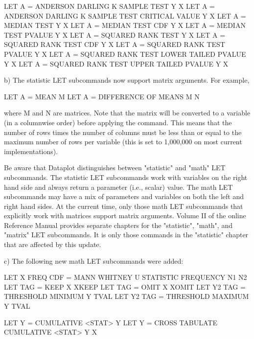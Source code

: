 {          LET A = ANDERSON DARLING K SAMPLE TEST                     Y X
          LET A = ANDERSON DARLING K SAMPLE TEST CRITICAL VALUE      Y X
          LET A = MEDIAN TEST                                        Y X
          LET A = MEDIAN TEST CDF                                    Y X
          LET A = MEDIAN TEST PVALUE                                 Y X
          LET A = SQUARED RANK TEST                                  Y X
          LET A = SQUARED RANK TEST CDF                              Y X
          LET A = SQUARED RANK TEST PVALUE                           Y X
          LET A = SQUARED RANK TEST LOWER TAILED PVALUE              Y X
          LET A = SQUARED RANK TEST UPPER TAILED PVALUE              Y X

    b) The statistic LET subcommands now support matrix arguments.
       For example,

            LET A = MEAN M
            LET A = DIFFERENCE OF MEANS M N

       where M and N are matrices.  Note that the matrix will be converted
       to a variable (in a columnwise order) before applying the command.
       This means that the number of rows times the number of columns must
       be less than or equal to the maximum number of rows per variable
       (this is set to 1,000,000 on most current implementations).

       Be aware that Dataplot distinguishes between "statistic" and "math"
       LET subcommands.  The statistic LET subcommands work with variables
       on the right hand side and always return a parameter (i.e., scalar)
       value.  The math LET subcommands may have a mix of parameters and
       variables on both the left and right hand sides.  At the current
       time, only those math LET subcommands that explicitly work with
       matrices support matrix arguments.  Volume II of the online Reference
       Manual provides separate chapters for the "statistic", "math", and
       "matrix" LET subcommands.  It is only those commands in the
       "statistic" chapter that are affected by this update.

    c) The following new math LET subcommands were added:

          LET X FREQ CDF = MANN WHITNEY U STATISTIC FREQUENCY N1 N2
          LET TAG = KEEP X XKEEP
          LET TAG = OMIT X XOMIT
          LET Y2 TAG = THRESHOLD MINIMUM Y TVAL
          LET Y2 TAG = THRESHOLD MAXIMUM Y TVAL

          LET Y = CUMULATIVE <STAT> Y
          LET Y = CROSS TABULATE CUMULATIVE <STAT> Y X

}
